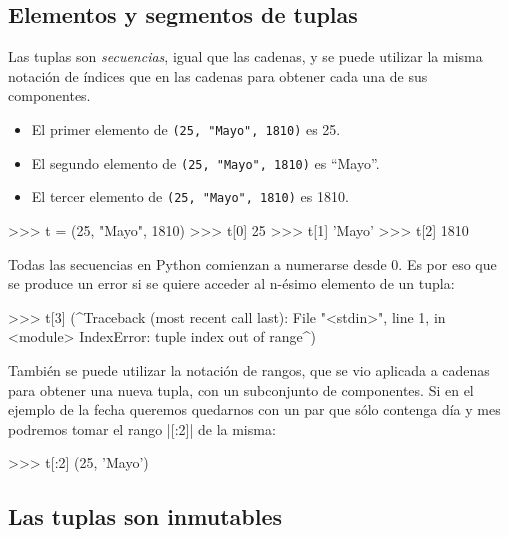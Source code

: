 \subsection{Elementos y segmentos de tuplas}

Las tuplas son \emph{secuencias}, igual que las cadenas, y se puede utilizar la
misma notación de índices que en las cadenas para obtener cada una de sus
componentes.

\begin{itemize}
\item El primer elemento de \lstinline!(25, "Mayo", 1810)! es 25.
\item El segundo elemento de \lstinline!(25, "Mayo", 1810)! es ``Mayo''.
\item El tercer elemento de \lstinline!(25, "Mayo", 1810)! es 1810.
\end{itemize}

\begin{codigo-python-sn}
>>> t = (25, "Mayo", 1810)
>>> t[0]
25
>>> t[1]
'Mayo'
>>> t[2]
1810
\end{codigo-python-sn}

\begin{atencion}
Todas las secuencias en Python comienzan a numerarse desde 0.  Es por eso
que se produce un error si se quiere acceder al n-ésimo elemento de un
tupla:

\begin{codigo-python-sn}
>>> t[3]
(^Traceback (most recent call last):
  File "<stdin>", line 1, in <module>
IndexError: tuple index out of range^)
\end{codigo-python-sn}
\end{atencion}

También se puede utilizar la notación de rangos, que se vio aplicada a
cadenas para obtener una nueva tupla, con un subconjunto de componentes. Si
en el ejemplo de la fecha queremos quedarnos con un par que sólo contenga
día y mes podremos tomar el rango |[:2]| de la misma:

\begin{codigo-python-sn}
>>> t[:2]
(25, 'Mayo')
\end{codigo-python-sn}


\subsection{Las tuplas son inmutables}

